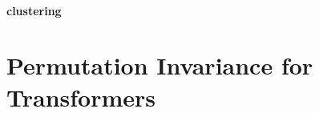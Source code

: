 \documentclass{article}
\begin{document}
\paragraph{clustering}


\section{Permutation Invariance for Transformers}



\end{document}
